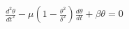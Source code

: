 \documentclass[10pt]{article}
\begin{document}
\begin{align*}\frac{d^2 \theta}{d t^2} - \mu \left( 1 - \frac{ \theta^2}{\delta^2} \right) \frac{d \theta}{d t} + \beta \theta = 0\end{align*}
\end{document}
